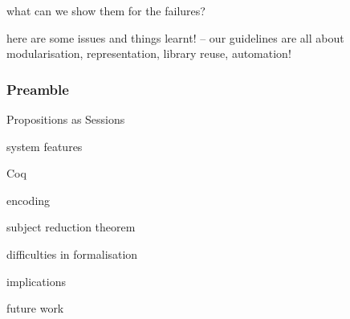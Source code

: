 \documentclass{beamer}
\begin{document}
what can we show them for the failures?

here are some issues and things learnt! -- our guidelines are all about
modularisation, representation, library reuse, automation!

\begin{frame}
\frametitle{Preamble}
\item Propositions as Sessions
\item system features
\item Coq
\item encoding
\item subject reduction theorem
\item difficulties in formalisation
\item implications
\item future work
\end{frame}

\printbibliography
\end{document}
